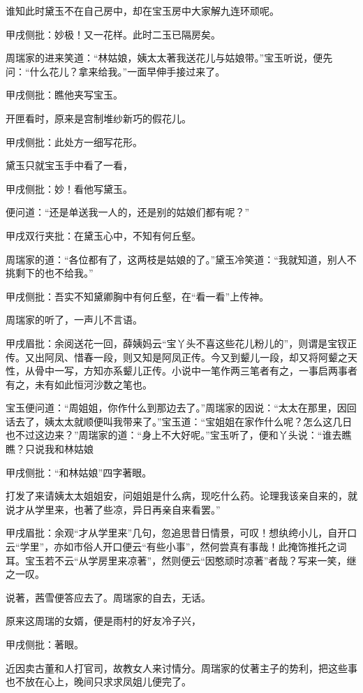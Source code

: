 \begin{parag}
    谁知此时黛玉不在自己房中，却在宝玉房中大家解九连环顽呢。\begin{note}甲戌侧批：妙极！又一花样。此时二玉已隔房矣。\end{note}周瑞家的进来笑道：“林姑娘，姨太太著我送花儿与姑娘带。”宝玉听说，便先问：“什么花儿？拿来给我。”一面早伸手接过来了。\begin{note}甲戌侧批：瞧他夹写宝玉。\end{note}开匣看时，原来是宫制堆纱新巧的假花儿。\begin{note}甲戌侧批：此处方一细写花形。\end{note}黛玉只就宝玉手中看了一看，\begin{note}甲戌侧批：妙！看他写黛玉。\end{note}便问道：“还是单送我一人的，还是别的姑娘们都有呢？”\begin{note}甲戌双行夹批：在黛玉心中，不知有何丘壑。\end{note}周瑞家的道：“各位都有了，这两枝是姑娘的了。”黛玉冷笑道：“我就知道，别人不挑剩下的也不给我。”\begin{note}甲戌侧批：吾实不知黛卿胸中有何丘壑，在“看一看”上传神。\end{note}周瑞家的听了，一声儿不言语。\begin{note}甲戌眉批：余阅送花一回，薛姨妈云“宝丫头不喜这些花儿粉儿的”，则谓是宝钗正传。又出阿凤、惜春一段，则又知是阿凤正传。今又到颦儿一段，却又将阿颦之天性，从骨中一写，方知亦系颦儿正传。小说中一笔作两三笔者有之，一事启两事者有之，未有如此恒河沙数之笔也。\end{note}宝玉便问道：“周姐姐，你作什么到那边去了。”周瑞家的因说：“太太在那里，因回话去了，姨太太就顺便叫我带来了。”宝玉道：“宝姐姐在家作什么呢？怎么这几日也不过这边来？”周瑞家的道：“身上不大好呢。”宝玉听了，便和丫头说：“谁去瞧瞧？只说我和林姑娘\begin{note}甲戌侧批：“和林姑娘”四字著眼。\end{note}打发了来请姨太太姐姐安，问姐姐是什么病，现吃什么药。论理我该亲自来的，就说才从学里来，也著了些凉，异日再亲自来看罢。”\begin{note}甲戌眉批：余观“才从学里来”几句，忽追思昔日情景，可叹！想纨绔小儿，自开口云“学里”，亦如市俗人开口便云“有些小事”，然何尝真有事哉！此掩饰推托之词耳。宝玉若不云“从学房里来凉著”，然则便云“因憨顽时凉著”者哉？写来一笑，继之一叹。\end{note}说著，茜雪便答应去了。周瑞家的自去，无话。
\end{parag}


\begin{parag}
    原来这周瑞的女婿，便是雨村的好友冷子兴，\begin{note}甲戌侧批：著眼。\end{note}近因卖古董和人打官司，故教女人来讨情分。周瑞家的仗著主子的势利，把这些事也不放在心上，晚间只求求凤姐儿便完了。
\end{parag}


